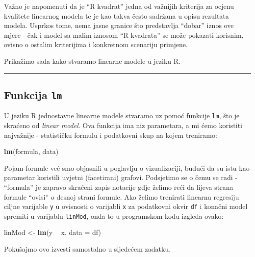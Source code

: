 \documentclass[]{book}
\newenvironment{Shaded}{\begin{snugshade}}{\end{snugshade}}
\newcommand{\KeywordTok}[1]{\textcolor[rgb]{0.13,0.29,0.53}{\textbf{#1}}}
\newcommand{\DataTypeTok}[1]{\textcolor[rgb]{0.13,0.29,0.53}{#1}}
\newcommand{\StringTok}[1]{\textcolor[rgb]{0.31,0.60,0.02}{#1}}
\newcommand{\OperatorTok}[1]{\textcolor[rgb]{0.81,0.36,0.00}{\textbf{#1}}}
\newcommand{\NormalTok}[1]{#1}
\theoremstyle{definition}
\theoremstyle{definition}
\theoremstyle{definition}
\theoremstyle{remark}
\begin{document}
Važno je napomenuti da je ``R kvadrat'' jedna od važnijih kriterija za
ocjenu kvalitete linearnog modela te je kao takva često sadržana u opisu
rezultata modela. Usprkos tome, nema jasne granice što predstavlja
``dobar'' iznos ove mjere - čak i model sa malim iznosom ``R kvadrata''
se može pokazati korisnim, ovisno o ostalim kriterijima i konkretnom
scenariju primjene.

Prikažimo sada kako stvaramo linearne modele u jeziku R.

\begin{center}\rule{0.5\linewidth}{\linethickness}\end{center}

\subsection{\texorpdfstring{Funkcija
\texttt{lm}}{Funkcija lm}}\label{funkcija-lm}

U jeziku R jednostavne linearne modele stvaramo uz pomoć funkcije
\texttt{lm}, što je skraćeno od \emph{linear model}. Ova funkcija ima
niz parametara, a mi ćemo koristiti najvažnije - statističku formulu i
podatkovni skup na kojem treniramo:

\begin{Shaded}
\begin{Highlighting}[]
\KeywordTok{lm}\NormalTok{(formula, data)}
\end{Highlighting}
\end{Shaded}

Pojam formule već smo objasnili u poglavlju o vizualizaciji, budući da
su istu kao parametar koristili uvjetni (facetirani) grafovi. Podsjetimo
se o čemu se radi - ``formula'' je zapravo skraćeni zapis notacije gdje
želimo reći da lijeva strana formule ``ovisi'' o desnoj strani formule.
Ako želimo trenirati linearnu regresiju ciljne varijable \texttt{y} u
ovisnosti o varijabli \texttt{x} za podatkovni okvir \texttt{df} i
konačni model spremiti u varijablu \texttt{linMod}, onda to u
programskom kodu izgleda ovako:

\begin{Shaded}
\begin{Highlighting}[]
\NormalTok{linMod <-}\StringTok{ }\KeywordTok{lm}\NormalTok{(y }\OperatorTok{~}\StringTok{ }\NormalTok{x, }\DataTypeTok{data =}\NormalTok{ df)}
\end{Highlighting}
\end{Shaded}

Pokušajmo ovo izvesti samostalno u sljedećem zadatku.
\end{document}
